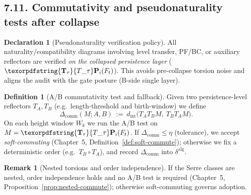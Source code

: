 \documentclass[11pt]{article}
\numberwithin{equation}{section}
\theoremstyle{plain}
\theoremstyle{definition}
\theoremstyle{remark}
\DeclareRobustCommand{\hyp}{\nobreakdash-}
\theoremstyle{plain}
\theoremstyle{definition}
\numberwithin{equation}{section}
\theoremstyle{definition}
\newtheorem{definition}[theorem]{Definition}
\newtheorem{remark}[theorem]{Remark}
\newtheorem{declaration}[theorem]{Declaration}
\DeclareRobustCommand{\Ttau}{\texorpdfstring{\ensuremath{\mathbf{T}_{\tau}}}{T\_\tau}}
\numberwithin{equation}{section}
\theoremstyle{plain}
\theoremstyle{definition}
\theoremstyle{remark}
\providecommand{\Tfun}[1]{\mathbf{T}_{#1}}
\providecommand{\Ttau}{\Tfun{\tau}}
\begin{document}
\subsection*{7.11. Commutativity and pseudonaturality tests after collapse}
\begin{declaration}[Pseudonaturality verification policy]\label{dec:pseudonat}
All naturality/compatibility diagrams involving level transfer, PF/BC, or auxiliary reflectors are verified \emph{on the collapsed persistence layer} (\(\Ttau\mathbf{P}_i(F_t)\)). This avoids pre\hyp collapse torsion noise and aligns the audit with the gate posture (B\hyp side single layer).
\end{declaration}

\begin{definition}[A/B commutativity test and fallback]\label{def:ab-test}
Given two persistence\hyp level reflectors \(T_A,T_B\) (e.g.\ length\hyp threshold and birth\hyp window) we define
\[
\Delta_{\mathrm{comm}}(M;A,B)\ :=\ d_{\mathrm{int}}\!\big(T_A T_B M,\ T_B T_A M\big).
\]
On each height window \(W_k\) we run the A/B test on \(M=\Ttau\mathbf{P}_i(F_t)\). If \(\Delta_{\mathrm{comm}}\le \eta\) (tolerance), we accept \emph{soft\hyp commuting} (Chapter~5, Definition~\ref{def:soft-commute}); otherwise we fix a deterministic order (e.g.\ \(T_B\circ T_A\)), and record \(\Delta_{\mathrm{comm}}\) into \(\delta^{\mathrm{alg}}\).
\end{definition}

\begin{remark}[Nested torsions and order independence]
If the Serre classes are nested, order independence holds and no A/B test is required (Chapter~5, Proposition~\ref{prop:nested-commute}); otherwise soft\hyp commuting governs adoption.
\end{remark}
\end{document}
